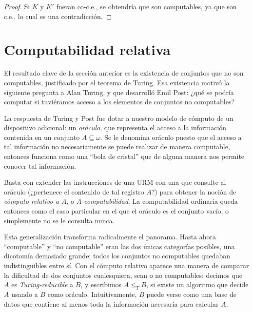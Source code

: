 \begin{proof}
	Si $K$ y $K'$ fueran co-c.e., se obtendría que son computables, ya que son c.e., lo cual es una contradicción.
\end{proof}

\section{Computabilidad relativa}

El resultado clave de la sección anterior es la existencia de conjuntos que no son computables, justificado por el teorema de Turing. Esa existencia motivó la siguiente pregunta a Alan Turing, y que desarrolló Emil Post: ¿qué se podría computar si tuviéramos acceso a los elementos de conjuntos no computables?

La respuesta de Turing y Post fue dotar a nuestro modelo de cómputo de un dispositivo adicional: un \emph{oráculo}, que representa el acceso a la información contenida en un conjunto $A\subseteq\omega$. Se le denomina oráculo puesto que el acceso a tal información no necesariamente se puede realizar de manera computable, entonces funciona como una ``bola de cristal'' que de alguna manera nos permite conocer tal información. 

Basta con extender las instrucciones de una URM con una que consulte al oráculo (¿pertenece el contenido de tal registro $A$?) para obtener la noción de \emph{cómputo relativo a $A$}, o \emph{$A$-computabilidad}. La computabilidad ordinaria queda entonces como el caso particular en el que el oráculo es el conjunto vacío, o simplemente no se le consulta nunca.

Esta generalización transforma radicalmente el panorama. Hasta ahora ``computable'' y ``no computable'' eran las dos únicas categorías posibles, una dicotomía demasiado grande: todos los conjuntos no computables quedaban indistinguibles entre sí. Con el cómputo relativo aparece una manera de comparar la dificultad de dos conjuntos cualesquiera, sean o no computables: decimos que $A$ es \emph{Turing-reducible} a $B$, y escribimos $A\leq_{T} B$, si existe un algoritmo que decide $A$ usando a $B$ como oráculo. Intuitivamente, $B$ puede verse como una base de datos que contiene al menos toda la información necesaria para calcular $A$. 

